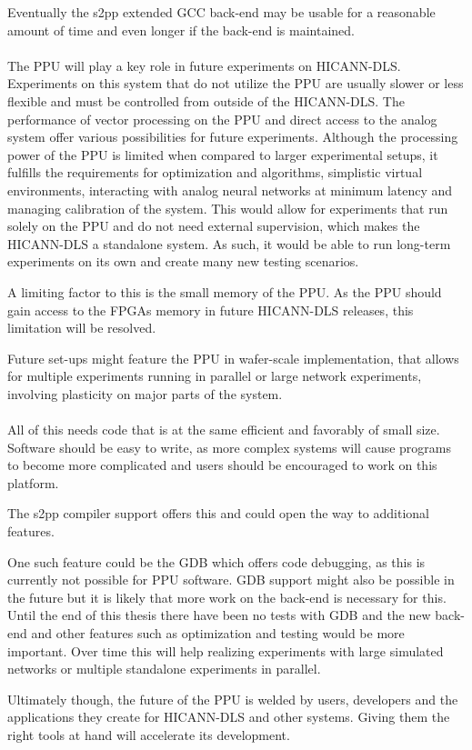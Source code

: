 Eventually the s2pp extended GCC back-end may be usable for a reasonable amount of time and even longer if the back-end is maintained.
\\
\\
The \ac{PPU} will play a key role in future experiments on \ac{HICANN-DLS}.
Experiments on this system that do not utilize the \ac{PPU} are usually slower or less flexible and must be controlled from outside of the \ac{HICANN-DLS}.
The performance of vector processing on the \ac{PPU} and direct access to the analog system offer various possibilities for future experiments.
Although the processing power of the \ac{PPU} is limited when compared to larger experimental setups, it fulfills the requirements for optimization and algorithms, simplistic virtual environments, interacting with analog neural networks at minimum latency and managing calibration of the system.
This would allow for experiments that run solely on the \ac{PPU} and do not need external supervision, which makes the \ac{HICANN-DLS} a standalone system.
As such, it would be able to run long-term experiments on its own and create many new testing scenarios.

A limiting factor to this is the small memory of the \ac{PPU}.
As the \ac{PPU} should gain access to the \ac{FPGA}s memory in future \ac{HICANN-DLS} releases, this limitation will be resolved.

Future set-ups might feature the \ac{PPU} in wafer-scale implementation, that allows for multiple experiments running in parallel or large network experiments, involving plasticity on major parts of the system.
\\
\\
All of this needs code that is at the same efficient and favorably of small size.
Software should be easy to write, as more complex systems will cause programs to become more complicated and users should be encouraged to work on this platform.

The s2pp compiler support offers this and could open the way to additional features.

One such feature could be the \ac{GDB} which offers code debugging, as this is currently not possible for \ac{PPU} software.
\ac{GDB} support might also be possible in the future but it is likely that more work on the back-end is necessary for this.
Until the end of this thesis there have been no tests with \ac{GDB} and the new back-end and other features such as optimization and testing would be more important.
Over time this will help realizing experiments with large simulated networks or multiple standalone experiments in parallel.

Ultimately though, the future of the \ac{PPU} is welded by users, developers and the applications they create for \ac{HICANN-DLS} and other systems.
Giving them the right tools at hand will accelerate its development.

